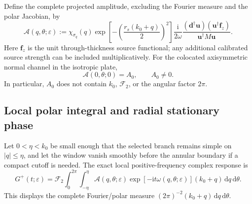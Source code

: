 Define the complete projected amplitude, excluding the Fourier measure and
the polar Jacobian, by
\begin{equation}
  \mathcal A(q,\theta;\varepsilon)
  :=\chi_{\sigma_q}(q)
    \exp\left[-\left(\frac{r_s(k_0+q)}{2}\right)^2\right]
    \frac{\mathrm i}{2\omega}
    \frac{(\mathbf d^\dagger\mathbf u)
          (\mathbf u^\dagger\mathbf f_z)}
         {\mathbf u^\dagger M\mathbf u}.
  \label{eq:complete-green-amplitude}
\end{equation}
Here \(\mathbf f_z\) is the unit through-thickness source functional; any
additional calibrated source strength can be included multiplicatively.
For the colocated axisymmetric normal channel in the isotropic plate,
\begin{equation}
  \mathcal A(0,\theta;0)=A_0,
  \qquad A_0\ne0.
  \label{eq:canonical-nonnodal-amplitude}
\end{equation}
In particular, \(A_0\) does not contain \(k_0\), \(\mathscr F_2\), or the
angular factor \(2\pi\).

\subsection{Local polar integral and radial stationary phase}

Let \(0<\eta<k_0\) be small enough that the selected branch remains simple
on \(|q|\leq\eta\), and let the window vanish smoothly before the annular
boundary if a compact cutoff is needed.  The exact local
positive-frequency complex response is
\begin{equation}
  G^{+}(t;\varepsilon)
  =\mathscr F_2
    \int_0^{2\pi}\!\int_{-\eta}^{\eta}
    \mathcal A(q,\theta;\varepsilon)
    \exp[-\mathrm it\omega(q,\theta;\varepsilon)]
    (k_0+q)\,\mathrm dq\,\mathrm d\theta.
  \label{eq:branch-projected-response}
\end{equation}
This displays the complete Fourier/polar measure
\((2\pi)^{-2}(k_0+q)\,\mathrm dq\,\mathrm d\theta\).

